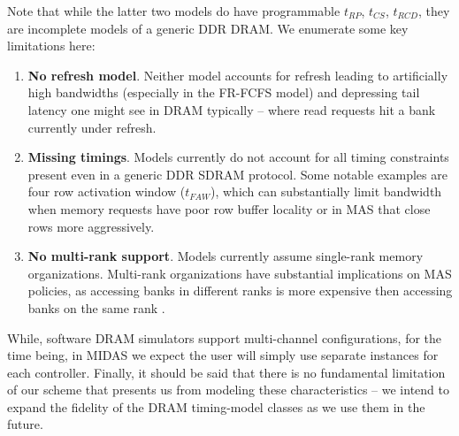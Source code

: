 Note that while the latter two models do have programmable $t_{RP}$, $t_{CS}$,
$t_{RCD}$, they are incomplete models of a generic DDR DRAM. We enumerate some
key limitations here:

\begin{enumerate}
    \item\textbf{No refresh model}. Neither model accounts for refresh leading to
        artificially high bandwidths (especially in the FR-FCFS model) and
        depressing tail latency one might see in DRAM typically -- where read
        requests hit a bank currently under refresh.

    \item\textbf{Missing timings}. Models currently do not account for all timing
        constraints present even in a generic DDR SDRAM protocol. Some notable
        examples are four row activation window ($t_{FAW}$), which can
        substantially limit bandwidth when memory requests have poor row buffer
        locality or in MAS that close rows more aggressively.

    \item\textbf{No multi-rank support}. Models currently assume single-rank
        memory organizations. Multi-rank organizations have substantial
        implications on MAS policies, as accessing banks in different ranks is
        more expensive then accessing banks on the same rank .

\end{enumerate}

While, software DRAM simulators support multi-channel configurations, for the
time being, in MIDAS we expect the user will simply use separate instances for
each controller.  Finally, it should be said that there is no fundamental
limitation of our scheme that presents us from modeling these characteristics
-- we intend to expand the fidelity of the DRAM timing-model classes as we use
them in the future.



